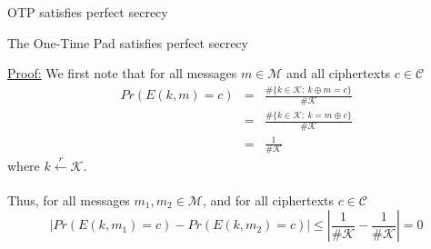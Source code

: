 \documentclass[aspectratio=169, lualatex, 10pt,dvipsnames,svgnames]{beamer} %
\newcommand{\Ccal}{\mathcal{C}}
\newcommand{\Kcal}{\mathcal{K}}
\newcommand{\Mcal}{\mathcal{M}}
\begin{document}
\begin{frame}{OTP satisfies perfect secrecy}
    \vspace{-0.5cm}
  \begin{theorem}[Shannon 1949]
    The One-Time Pad satisfies perfect secrecy
  \end{theorem}

  \underline{Proof:} We first note that for all messages $m\in\Mcal$ and all ciphertexts $c\in\Ccal$
  \[
  \begin{array}{lcl}
    Pr(E(k, m) = c) & {=} & {\frac{\#\{k\in\Kcal:\ k\oplus m = c\}}{\#\Kcal}} \\[0.2cm]
                    & {=} & {\frac{\#\{k\in\Kcal:\ k = m\oplus c\}}{\#\Kcal}} \\[0.2cm]
                    & {=} & {\frac{1}{\#\Kcal}}
  \end{array}
  \]
  {where $k \xleftarrow[]{r} \Kcal$.}

  {Thus, for all messages $m_1, m_2\in\Mcal$, and for all ciphertexts $c\in\Ccal$}
  \[
    {\left| Pr(E(k, m_1) = c) - Pr(E(k, m_2) = c)
      \right| \le} {\left|\frac{1}{\#\Kcal} - \frac{1}{\#\Kcal}\right| = 0}
  \]

  
\end{frame}
\end{document}

